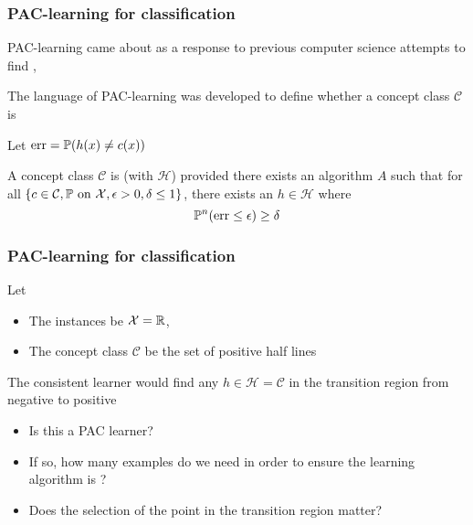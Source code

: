 \documentclass[12pt]{beamer}
\begin{document}
\begin{frame}[fragile]
\frametitle{PAC-learning for classification}
PAC-learning came about as a response to previous computer science attempts to find ,


\vsp
The language of PAC-learning was developed to define whether a concept class $\mathcal{C}$ is 

\vsp
Let $\textrm{err} = \P(h(x) \neq c(x))$

\vsp

A concept class $\mathcal{C}$ is  (with $\mathcal{H}$) provided there exists an algorithm $A$ such that 
for all $\{c \in \mathcal{C}, \P \textrm{ on } \mathcal{X}, \epsilon > 0, \delta \leq 1\}$, there exists an $h \in \mathcal{H}$ where
\[
\P^n (\textrm{err} \leq \epsilon) \geq \delta
\]
%
\end{frame}

\begin{frame}[fragile]
\frametitle{PAC-learning for classification}
 Let 
\begin{itemize}
\item The instances be $\mathcal{X} = \R$,
\item The concept class $\mathcal{C}$ be the set of positive half lines 

\end{itemize}
\vsp

The consistent learner would find any $h \in \mathcal{H} = \mathcal{C}$ in the transition region from negative to positive

\vsp
\begin{itemize}
\item Is this a PAC learner?  
\item If so, how many examples do we need in order to ensure the learning algorithm is 
?

\item Does the selection of the point in the transition region matter?
\end{itemize}

\end{frame}
\end{document}
